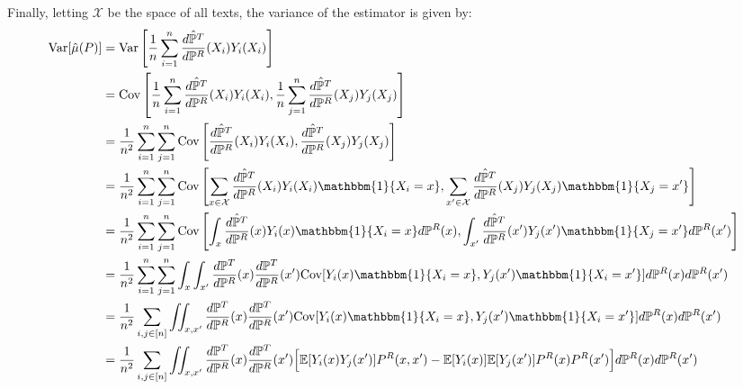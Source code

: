 \documentclass{article}
\begin{document}
Finally, letting $\mathcal{X}$ be the space of all texts, the variance of the estimator is given by:
\begin{align*}
    \text{Var}[\hat{\mu}(P)] &= \text{Var}\left[\frac{1}{n} \sum_{i=1}^n \frac{\hat{d \mathbb{P}^T}}{d \mathbb{P}^R}(X_i)Y_i(X_i)\right] \\
    &= \text{Cov}\left[\frac{1}{n} \sum_{i=1}^n \frac{\hat{d \mathbb{P}^T}}{d \mathbb{P}^R}(X_i)Y_i(X_i), \frac{1}{n} \sum_{j=1}^n \frac{\hat{d \mathbb{P}^T}}{d \mathbb{P}^R}(X_j)Y_j(X_j)\right] \\
    &= \frac{1}{n^2}\sum_{i=1}^n \sum_{j=1}^n \text{Cov}\left[\frac{\hat{d \mathbb{P}^T}}{d \mathbb{P}^R}(X_i)Y_i(X_i), \frac{\hat{d \mathbb{P}^T}}{d \mathbb{P}^R}(X_j)Y_j(X_j)\right] \\
    &= \frac{1}{n^2}\sum_{i=1}^n \sum_{j=1}^n \text{Cov}\left[\sum_{x \in \mathcal{X}}\frac{\hat{d \mathbb{P}^T}}{d \mathbb{P}^R}(X_i)Y_i(X_i)\mathbbm{1}\{X_i = x\}, \sum_{x' \in \mathcal{X}}\frac{\hat{d \mathbb{P}^T}}{d \mathbb{P}^R}(X_j)Y_j(X_j)\mathbbm{1}\{X_j=x'\}\right] \\
    &= \frac{1}{n^2}\sum_{i=1}^n \sum_{j=1}^n \text{Cov}\left[\int_x\frac{\hat{d \mathbb{P}^T}}{d \mathbb{P}^R}(x)Y_i(x)\mathbbm{1}\{X_i = x\}d\mathbb{P}^R(x), \int_{x'}\frac{\hat{d \mathbb{P}^T}}{d \mathbb{P}^R}(x')Y_j(x')\mathbbm{1}\{X_j=x'\}d\mathbb{P}^R(x')\right] \\
    &= \frac{1}{n^2} \sum_{i=1}^n \sum_{j=1}^n \int_x \int_{x'} \frac{d \mathbb{P}^T}{d \mathbb{P}^R}(x)\frac{d \mathbb{P}^T}{d \mathbb{P}^R}(x') \text{Cov}[Y_i(x)\mathbbm{1}\{X_i=x\}, Y_j(x')\mathbbm{1}\{X_i=x'\}]d\mathbb{P}^R(x)d\mathbb{P}^R(x') \\
    &= \frac{1}{n^2} \sum_{i,j \in [n]} \iint_{x, x'} \frac{d \mathbb{P}^T}{d \mathbb{P}^R}(x)\frac{d \mathbb{P}^T}{d \mathbb{P}^R}(x') \text{Cov}[Y_i(x)\mathbbm{1}\{X_i=x\}, Y_j(x')\mathbbm{1}\{X_i=x'\}]d\mathbb{P}^R(x)d\mathbb{P}^R(x') \\
    &= \frac{1}{n^2} \sum_{i,j \in [n]} \iint_{x, x'} \frac{d \mathbb{P}^T}{d \mathbb{P}^R}(x)\frac{d \mathbb{P}^T}{d \mathbb{P}^R}(x') \Big[\mathbb{E}[Y_i(x)Y_j(x')]P^R(x,x') - \mathbb{E}[Y_i(x)]\mathbb{E}[Y_j(x')]P^R(x)P^R(x')\Big] d\mathbb{P}^R(x)d\mathbb{P}^R(x')
\end{align*}
\end{document}
